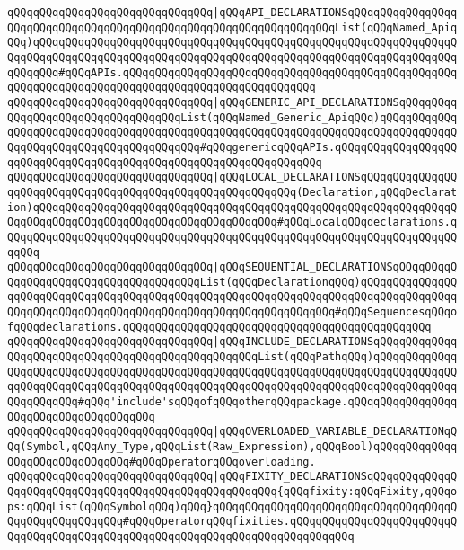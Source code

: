 \verb|qQQqqQQqqQQqqQQqqQQqqQQqqQQqqQQq|\verb#|qQQqAPI_DECLARATIONSqQQqqQQqqQQqqQQqqQQqqQQqqQQqqQQqqQQqqQQqqQQqqQQqqQQqqQQqqQQqqQQqqQQqList(qQQqNamed_ApiqQQq)qQQqqQQqqQQqqQQqqQQqqQQqqQQqqQQqqQQqqQQqqQQqqQQqqQQqqQQqqQQqqQQqqQQqqQQqqQQqqQQqqQQqqQQqqQQqqQQqqQQqqQQqqQQqqQQqqQQqqQQqqQQqqQQqqQQqqQQqqQQqqQQq#\verb|#qQQqAPIs.qQQqqQQqqQQqqQQqqQQqqQQqqQQqqQQqqQQqqQQqqQQqqQQqqQQqqQQqqQQqqQQqqQQqqQQqqQQqqQQqqQQqqQQqqQQqqQQqqQQq|\newline
\verb|qQQqqQQqqQQqqQQqqQQqqQQqqQQqqQQq|\verb#|qQQqGENERIC_API_DECLARATIONSqQQqqQQqqQQqqQQqqQQqqQQqqQQqqQQqqQQqList(qQQqNamed_Generic_ApiqQQq)qQQqqQQqqQQqqQQqqQQqqQQqqQQqqQQqqQQqqQQqqQQqqQQqqQQqqQQqqQQqqQQqqQQqqQQqqQQqqQQqqQQqqQQqqQQqqQQqqQQqqQQqqQQqqQQq#\verb|#qQQqgenericqQQqAPIs.qQQqqQQqqQQqqQQqqQQqqQQqqQQqqQQqqQQqqQQqqQQqqQQqqQQqqQQqqQQqqQQqqQQq|\newline
\verb|qQQqqQQqqQQqqQQqqQQqqQQqqQQqqQQq|\verb#|qQQqLOCAL_DECLARATIONSqQQqqQQqqQQqqQQqqQQqqQQqqQQqqQQqqQQqqQQqqQQqqQQqqQQqqQQqqQQq(Declaration,qQQqDeclaration)qQQqqQQqqQQqqQQqqQQqqQQqqQQqqQQqqQQqqQQqqQQqqQQqqQQqqQQqqQQqqQQqqQQqqQQqqQQqqQQqqQQqqQQqqQQqqQQqqQQqqQQqqQQq#\verb|#qQQqLocalqQQqdeclarations.qQQqqQQqqQQqqQQqqQQqqQQqqQQqqQQqqQQqqQQqqQQqqQQqqQQqqQQqqQQqqQQqqQQqqQQqqQQq|\newline
\verb|qQQqqQQqqQQqqQQqqQQqqQQqqQQqqQQq|\verb#|qQQqSEQUENTIAL_DECLARATIONSqQQqqQQqqQQqqQQqqQQqqQQqqQQqqQQqqQQqqQQqList(qQQqDeclarationqQQq)qQQqqQQqqQQqqQQqqQQqqQQqqQQqqQQqqQQqqQQqqQQqqQQqqQQqqQQqqQQqqQQqqQQqqQQqqQQqqQQqqQQqqQQqqQQqqQQqqQQqqQQqqQQqqQQqqQQqqQQqqQQqqQQqqQQqqQQq#\verb|#qQQqSequencesqQQqofqQQqdeclarations.qQQqqQQqqQQqqQQqqQQqqQQqqQQqqQQqqQQqqQQqqQQqqQQq|\newline
\verb|qQQqqQQqqQQqqQQqqQQqqQQqqQQqqQQq|\verb#|qQQqINCLUDE_DECLARATIONSqQQqqQQqqQQqqQQqqQQqqQQqqQQqqQQqqQQqqQQqqQQqqQQqqQQqList(qQQqPathqQQq)qQQqqQQqqQQqqQQqqQQqqQQqqQQqqQQqqQQqqQQqqQQqqQQqqQQqqQQqqQQqqQQqqQQqqQQqqQQqqQQqqQQqqQQqqQQqqQQqqQQqqQQqqQQqqQQqqQQqqQQqqQQqqQQqqQQqqQQqqQQqqQQqqQQqqQQqqQQqqQQqqQQq#\verb|#qQQq'include'sqQQqofqQQqotherqQQqpackage.qQQqqQQqqQQqqQQqqQQqqQQqqQQqqQQqqQQqqQQq|\newline
\verb|qQQqqQQqqQQqqQQqqQQqqQQqqQQqqQQq|\verb#|qQQqOVERLOADED_VARIABLE_DECLARATIONqQQq(Symbol,qQQqAny_Type,qQQqList(Raw_Expression),qQQqBool)qQQqqQQqqQQqqQQqqQQqqQQqqQQqqQQq#\verb|#qQQqOperatorqQQqoverloading.|\newline
\verb|qQQqqQQqqQQqqQQqqQQqqQQqqQQqqQQq|\verb#|qQQqFIXITY_DECLARATIONSqQQqqQQqqQQqqQQqqQQqqQQqqQQqqQQqqQQqqQQqqQQqqQQqqQQqqQQq{qQQqfixity:qQQqFixity,qQQqops:qQQqList(qQQqSymbolqQQq)qQQq}qQQqqQQqqQQqqQQqqQQqqQQqqQQqqQQqqQQqqQQqqQQqqQQqqQQqqQQq#\verb|#qQQqOperatorqQQqfixities.qQQqqQQqqQQqqQQqqQQqqQQqqQQqqQQqqQQqqQQqqQQqqQQqqQQqqQQqqQQqqQQqqQQqqQQqqQQqqQQq|\newline
